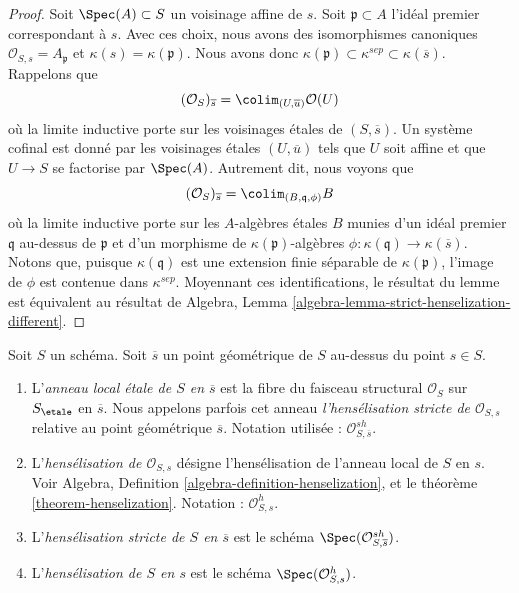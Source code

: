 \begin{proof}
Soit $\Spec(A) \subset S$ un voisinage affine de $s$.
Soit $\mathfrak p \subset A$ l'id\'eal premier correspondant \`a $s$.
Avec ces choix, nous avons des isomorphismes canoniques
$\mathcal{O}_{S, s} = A_{\mathfrak p}$ et $\kappa(s) = \kappa(\mathfrak p)$.
Nous avons donc
$\kappa(\mathfrak p) \subset \kappa^{sep} \subset \kappa(\overline{s})$.
Rappelons que
$$
(\mathcal{O}_S)_{\overline{s}} =
\colim_{(U, \overline{u})} \mathcal{O}(U)
$$
o\`u la limite inductive porte sur les voisinages \'etales de $(S, \overline{s})$.
Un syst\`eme cofinal est donn\'e par les voisinages \'etales $(U, \overline{u})$
tels que $U$ soit affine et que $U \to S$ se factorise par $\Spec(A)$.
Autrement dit, nous voyons que
$$
(\mathcal{O}_S)_{\overline{s}} = \colim_{(B, \mathfrak q, \phi)} B
$$
o\`u la limite inductive porte sur les $A$-alg\`ebres \'etales $B$ munies d'un id\'eal premier
$\mathfrak q$ au-dessus de $\mathfrak p$ et d'un
morphisme de $\kappa(\mathfrak p)$-alg\`ebres
$\phi : \kappa(\mathfrak q) \to \kappa(\overline{s})$.
Notons que, puisque $\kappa(\mathfrak q)$ est une extension finie s\'eparable de
$\kappa(\mathfrak p)$, l'image de $\phi$ est contenue dans $\kappa^{sep}$.
Moyennant ces identifications, le r\'esultat du lemme est \'equivalent
au r\'esultat de
Algebra, Lemma \ref{algebra-lemma-strict-henselization-different}.
\end{proof}

\begin{definition}
\label{definition-etale-local-rings}
Soit $S$ un sch\'ema. Soit $\overline{s}$ un point g\'eom\'etrique de $S$
au-dessus du point $s \in S$.
\begin{enumerate}
\item L'{\it anneau local \'etale de $S$ en $\overline{s}$}
est la fibre du faisceau structural $\mathcal{O}_S$ sur $S_\etale$
en $\overline{s}$. Nous appelons parfois cet anneau
{\it l'hens\'elisation stricte de $\mathcal{O}_{S, s}$} relative
au point g\'eom\'etrique $\overline{s}$.
Notation utilis\'ee : $\mathcal{O}_{S, \overline{s}}^{sh}$.
\item L'{\it hens\'elisation de $\mathcal{O}_{S, s}$} d\'esigne
l'hens\'elisation de l'anneau local de $S$ en $s$. Voir
Algebra, Definition \ref{algebra-definition-henselization},
et le
th\'eor\`eme \ref{theorem-henselization}.
Notation : $\mathcal{O}_{S, s}^h$.
\item L'{\it hens\'elisation stricte de $S$ en $\overline{s}$}
est le sch\'ema $\Spec(\mathcal{O}_{S, \overline{s}}^{sh})$.
\item L'{\it hens\'elisation de $S$ en $s$} est le sch\'ema
$\Spec(\mathcal{O}_{S, s}^h)$.
\end{enumerate}
\end{definition}

